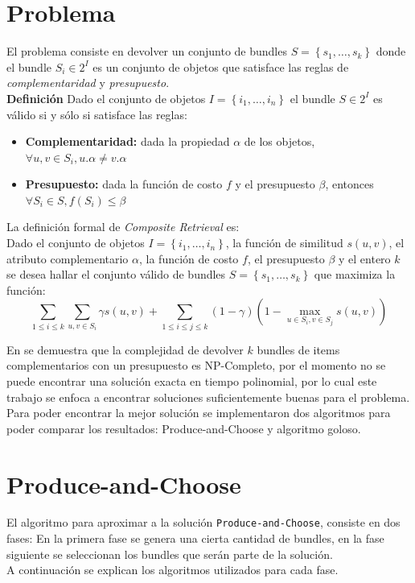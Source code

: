 \section{Problema}
El problema consiste en devolver un conjunto de bundles $S = \left\{s_1, \ldots, s_k\right\}$ donde el bundle $S_i \in 2^{I}$ es un conjunto de objetos que satisface las reglas de \textit{complementaridad} y \textit{presupuesto}.\\
\textbf{Definición} Dado el conjunto de objetos $I=\left\{i_1,\ldots, i_n\right\}$ el bundle $S \in 2^{I}$ es válido si y sólo si satisface las reglas:
\begin{itemize}
	\item \textbf{Complementaridad:} dada la propiedad $\alpha$ de los objetos, $\forall u,v \in S_i, u.\alpha \neq v.\alpha$
	\item \textbf{Presupuesto:} dada la función de costo $f$ y el presupuesto $\beta$, entonces $\forall S_i \in S, f(S_i) \leq \beta$
\end{itemize}

La definición formal de \textit{Composite Retrieval} es:\\
Dado el conjunto de objetos $I = \left\{i_1, \ldots, i_n \right\}$, la función de similitud $s(u,v)$, el atributo complementario $\alpha$, la función de costo $f$, el presupuesto $\beta$ y el entero $k$ se desea hallar el conjunto válido de bundles $S = \left\{s_1, \ldots, s_k\right\}$ que maximiza la función:
\begin{equation} \label{des:eq-fnObj}
  \sum_{1 \leq i \leq k}{\sum_{u,v \in S_i}{\gamma s(u,v)}} + \sum_{1 \leq i \leq j \leq k}{(1-\gamma) (1-\max_{u \in S_i, v \in S_j}{s(u,v)})}
\end{equation}

En \cite{compositeRetrival} se demuestra que la complejidad de devolver $k$ bundles de items complementarios con un presupuesto es NP-Completo, por el momento no se puede encontrar una solución exacta en tiempo polinomial, por lo cual este trabajo se enfoca a encontrar soluciones suficientemente buenas para el problema. Para poder encontrar la mejor solución se implementaron dos algoritmos para poder comparar los resultados: Produce-and-Choose y algoritmo goloso.

\section{Produce-and-Choose}
El algoritmo para aproximar a la solución \texttt{Produce-and-Choose}, consiste en dos fases: En la primera fase se genera una cierta cantidad de bundles, en la fase siguiente se seleccionan los bundles que serán parte de la solución.\\
A continuación se explican los algoritmos utilizados para cada fase.
